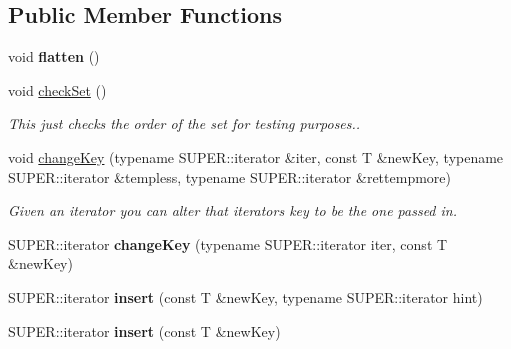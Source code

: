 \subsection*{Public Member Functions}
\begin{DoxyCompactItemize}
\item 
void {\bfseries flatten} ()\hypertarget{classListMutableSet_a4a093a8574ad192af93477436a3ce0e5}{}\label{classListMutableSet_a4a093a8574ad192af93477436a3ce0e5}

\item 
void \hyperlink{classListMutableSet_a3860de511d3f9480d8eedad51bbe66ac}{check\+Set} ()\hypertarget{classListMutableSet_a3860de511d3f9480d8eedad51bbe66ac}{}\label{classListMutableSet_a3860de511d3f9480d8eedad51bbe66ac}

\begin{DoxyCompactList}\small\item\em This just checks the order of the set for testing purposes.. \end{DoxyCompactList}\item 
void \hyperlink{classListMutableSet_a7540fc87f18d5019e2e94b04bbb4383d}{change\+Key} (typename S\+U\+P\+E\+R\+::iterator \&iter, const T \&new\+Key, typename S\+U\+P\+E\+R\+::iterator \&templess, typename S\+U\+P\+E\+R\+::iterator \&rettempmore)
\begin{DoxyCompactList}\small\item\em Given an iterator you can alter that iterator\textquotesingle{}s key to be the one passed in. \end{DoxyCompactList}\item 
S\+U\+P\+E\+R\+::iterator {\bfseries change\+Key} (typename S\+U\+P\+E\+R\+::iterator iter, const T \&new\+Key)\hypertarget{classListMutableSet_a38f1754915730cde02bd9459710a10fc}{}\label{classListMutableSet_a38f1754915730cde02bd9459710a10fc}

\item 
S\+U\+P\+E\+R\+::iterator {\bfseries insert} (const T \&new\+Key, typename S\+U\+P\+E\+R\+::iterator hint)\hypertarget{classListMutableSet_a58341324365191a01f884960c3160dcd}{}\label{classListMutableSet_a58341324365191a01f884960c3160dcd}

\item 
S\+U\+P\+E\+R\+::iterator {\bfseries insert} (const T \&new\+Key)\hypertarget{classListMutableSet_a33161253b3430ab777d7b8122da8fb9f}{}\label{classListMutableSet_a33161253b3430ab777d7b8122da8fb9f}

\end{DoxyCompactItemize}


